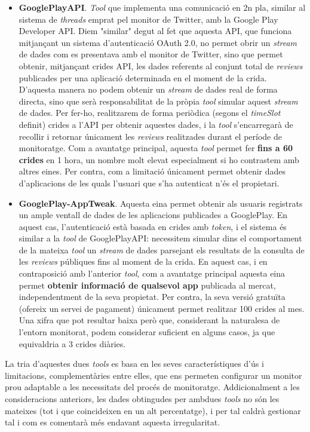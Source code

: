 \begin{itemize}
\item \textbf{GooglePlayAPI}. \textit{Tool} que implementa una comunicació en 2n pla, similar al sistema de \textit{threads} emprat pel monitor de Twitter, amb la Google Play Developer API. Diem "similar" degut al fet que aquesta API, que funciona mitjançant un sistema d'autenticació OAuth 2.0, no permet obrir un \textit{stream} de dades com es presentava amb el monitor de Twitter, sino que permet obtenir, mitjançant crides API, les dades referents al conjunt total de \textit{reviews} publicades per una aplicació determinada en el moment de la crida. D'aquesta manera no podem obtenir un \textit{stream} de dades real de forma directa, sino que serà responsabilitat de la pròpia \textit{tool} simular aquest \textit{stream} de dades. Per fer-ho, realitzarem de forma periòdica (segons el \textit{timeSlot} definit) crides a l'API per obtenir aquestes dades, i la \textit{tool} s'encarregarà de recollir i retornar únicament les \textit{reviews} realitzades durant el període de monitoratge. Com a avantatge principal, aquesta \textit{tool} permet fer \textbf{fins a 60 crides} en 1 hora, un nombre molt elevat especialment si ho contrastem amb altres eines. Per contra, com a limitació únicament permet obtenir dades d'aplicacions de les quals l'usuari que s'ha autenticat n'és el propietari.
\item \textbf{GooglePlay-AppTweak}. Aquesta eina permet obtenir als usuaris registrats un ample ventall de dades de les aplicacions publicades a GooglePlay. En aquest cas, l'autenticació està basada en crides amb \textit{token}, i el sistema és similar a la \textit{tool} de GooglePlayAPI: necessitem simular dins el comportament de la mateixa \textit{tool} un \textit{stream} de dades parsejant els resultats de la consulta de les \textit{reviews} públiques fins al moment de la crida. En aquest cas, i en contraposició amb l'anterior \textit{tool}, com a avantatge principal aquesta eina permet \textbf{obtenir informació de qualsevol app} publicada al mercat, independentment de la seva propietat. Per contra, la seva versió gratuïta (ofereix un servei de pagament) únicament permet realitzar 100 crides al mes. Una xifra que pot resultar baixa però que, considerant la naturalesa de l'entorn monitorat, podem considerar suficient en alguns casos, ja que equivaldria a 3 crides diàries. 
\end{itemize}

La tria d'aquestes dues \textit{tools} es basa en les seves característiques d'ús i limitacions, complementàries entre elles, que ens permeten configurar un monitor prou adaptable a les necessitats del procés de monitoratge. Addicionalment a les consideracions anteriors, les dades obtingudes per ambdues \textit{tools} no són les mateixes (tot i que coincideixen en un alt percentatge), i per tal caldrà gestionar tal i com es comentarà més endavant aquesta irregularitat.\\

